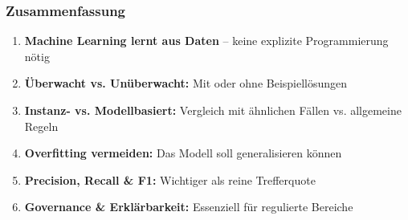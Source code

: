 \documentclass[11pt, aspectratio=169]{beamer}
\begin{document}

\begin{frame}
    \frametitle{Zusammenfassung}
    \begin{enumerate}
        \item \textbf{Machine Learning lernt aus Daten} -- keine explizite Programmierung nötig
        \vspace{0.2cm}
        \item \textbf{Überwacht vs. Unüberwacht:} Mit oder ohne Beispiellösungen
        \vspace{0.2cm}
        \item \textbf{Instanz- vs. Modellbasiert:} Vergleich mit ähnlichen Fällen vs. allgemeine Regeln
        \vspace{0.2cm}
        \item \textbf{Overfitting vermeiden:} Das Modell soll generalisieren können
        \vspace{0.2cm}
        \item \textbf{Precision, Recall \& F1:} Wichtiger als reine Trefferquote
        \vspace{0.2cm}
        \item \textbf{Governance \& Erklärbarkeit:} Essenziell für regulierte Bereiche
    \end{enumerate}
\end{frame}
\end{document}
